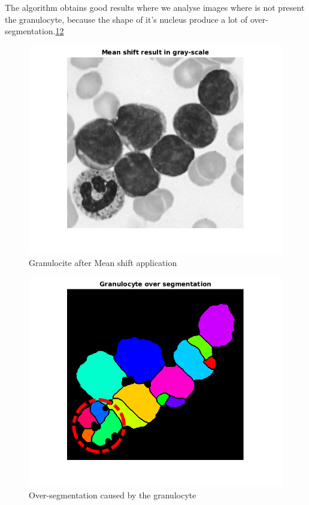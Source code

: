 \bigskip

The algorithm obtains good results where we analyse images where is not present the granulocyte, because the shape of it's nucleus produce a lot of over-segmentation.\ref{fig:grangray}\ref{fig:gran}
\begin{figure}
\begin{center}
		\includegraphics[scale=0.5]{img/final/meangran.png}
		\caption{Granulocite after Mean shift application}
		\label{fig:grangray}
\end{center}
\end{figure}
\begin{figure}
\begin{center}
		\includegraphics[scale=0.5]{img/final/fingran.png}
		\caption{Over-segmentation caused by the granulocyte}
		\label{fig:gran}
\end{center}
\end{figure}

